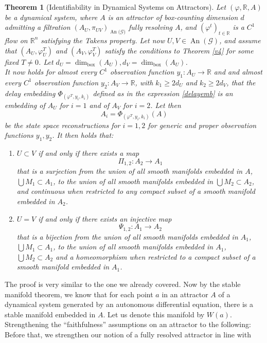 \documentclass[11pt, a4paper]{memoir}
\theoremstyle{break}
\newtheorem{thm}{Theorem}
\theoremstyle{break}
\theoremstyle{nonumberplain}
\newcommand{\mR}{\mathbb{R}}
\DeclareMathOperator{\an}{An}
\begin{document}
\begin{thm}[Identifiability in Dynamical Systems on Attractors]
Let $(\varphi, \mR,A)$ be a dynamical system, where $A$ is an attractor of box-counting dimension $d$ admitting a filtration $(A_U,\pi_{UV})_{\an(\mathcal{G)}}$ fully resolving $A$, and $(\varphi^t)_{t\in \mR}$ is a $C^1$ flow on $\mR^n$ satisfying the Takens property. Let now $U,V\in\an( \mathcal{G})$, and assume that $(A_U,\varphi_U^T)$ and $(A_V,\varphi_V^T)$ satisfy the conditions to Theorem \ref{v4} for some fixed $T\neq 0$. Let $d_U=\dim_{\text{box}}(A_U), d_V=\dim_{\text{box}}(A_U)$.\\
It now holds for almost every $C^1$ observation function $y_1:A_U\to\mR$ and and almost every $C^1$ observation function $y_2:A_V\to \mR$, with $k_1\geqslant 2d_U$ and $k_2\geqslant 2d_V$, that the delay embedding $\Phi_{(\varphi^T,y_i,k_i)}$ defined as in the expression \ref{delayemb} is an embedding of $A_U$ for $i=1$ and of $A_V$ for $i=2$. Let then 
$$A_i=\Phi_{(\varphi^T,y_i,k_i)}(A)$$ 
be the state space reconstructions for $i=1,2$ for generic and proper observation functions $y_1,y_2$. It then holds that:
\begin{enumerate}[label=\roman*.]
	\item $U\subset V$ if and only if there exists a map
	$$\Pi_{1,2}:A_2\to A_1$$ 
	that is a surjection from the union of all smooth manifolds embedded in $A$, $\bigcup M_1\subset A_1$, to the union of all smooth manifolds embedded in $\bigcup M_2\subset A_2$, and continuous when restricted to any compact subset of a smooth manifold embedded in $A_2$.
	\item $U=V$ if and only if there exists  an injective map
	$$\Psi_{1,2}:A_1\to A_2$$
	that is a bijection from the union of all smooth manifolds embedded in $A_1$, $\bigcup M_1\subset A_1$, to the union of all smooth manifolds embedded in $A_1$, $\bigcup M_2\subset A_2$ and a homeomorphism when restricted to a compact subset of a smooth manifold embedded in $A_1$.
\end{enumerate}
\end{thm}
The proof is very similar to the one we already covered. Now by the stable manifold theorem, we know that for each point $a$ in an attractor $A$ of a dynamical system generated by an autonomous differential equation, there is a stable manifold embedded in $A$. Let us denote this manifold by $W(a)$. Strengthening the \enquote{faithfulness} assumptions on an attractor to the following:
Before that, we strengthen our notion of a fully resolved attractor in line with \cite{mathFound}
\end{document}
